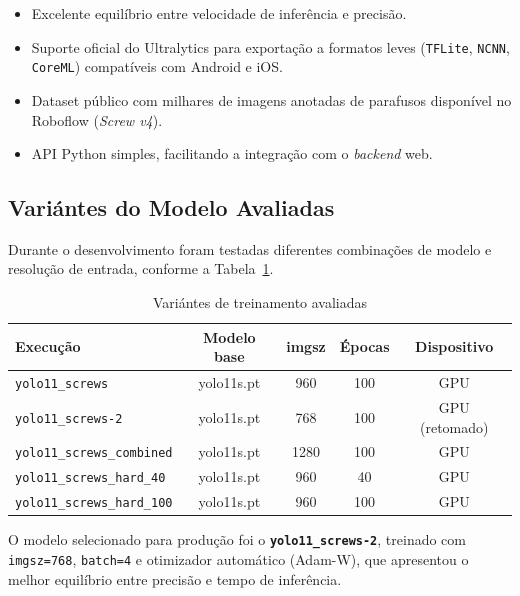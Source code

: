 \documentclass[12pt,a4paper]{article}
\begin{document}
\begin{itemize}[leftmargin=*]
  \item Excelente equil\'ibrio entre velocidade de infer\^encia e precis\~ao.
  \item Suporte oficial do Ultralytics para exporta\c{c}\~ao a formatos leves
        (\texttt{TFLite}, \texttt{NCNN}, \texttt{CoreML}) compat\'iveis com Android e iOS.
  \item Dataset p\'ublico com milhares de imagens anotadas de parafusos dispon\'ivel
        no Roboflow (\emph{Screw v4}).
  \item API Python simples, facilitando a integra\c{c}\~ao com o \emph{backend} web.
\end{itemize}

\subsection{Vari\'antes do Modelo Avaliadas}

Durante o desenvolvimento foram testadas diferentes combina\c{c}\~oes de modelo e
resolu\c{c}\~ao de entrada, conforme a Tabela~\ref{tab:modelos}.

\begin{table}[H]
  \centering
  \caption{Vari\'antes de treinamento avaliadas}
  \label{tab:modelos}
  \begin{tabular}{lcccc}
    \toprule
    \textbf{Execu\c{c}\~ao} & \textbf{Modelo base} & \textbf{imgsz} &
    \textbf{\'Epocas} & \textbf{Dispositivo} \\
    \midrule
    \texttt{yolo11\_screws}            & yolo11s.pt & 960  & 100 & GPU \\
    \texttt{yolo11\_screws-2}          & yolo11s.pt & 768  & 100 & GPU (retomado) \\
    \texttt{yolo11\_screws\_combined}  & yolo11s.pt & 1280 & 100 & GPU \\
    \texttt{yolo11\_screws\_hard\_40}  & yolo11s.pt & 960  &  40 & GPU \\
    \texttt{yolo11\_screws\_hard\_100} & yolo11s.pt & 960  & 100 & GPU \\
    \bottomrule
  \end{tabular}
\end{table}

O modelo selecionado para produ\c{c}\~ao foi o \textbf{\texttt{yolo11\_screws-2}},
treinado com \texttt{imgsz=768}, \texttt{batch=4} e otimizador autom\'atico (Adam-W),
que apresentou o melhor equil\'ibrio entre precis\~ao e tempo de infer\^encia.
\end{document}
